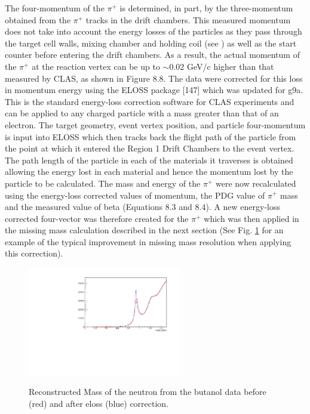 The four-momentum of the $\pi^+$ is determined, in part, by the three-momentum obtained from the $\pi^+$ tracks in the drift chambers. This measured momentum does not take into account the energy losses of the particles as they pass through the target cell walls, mixing chamber and holding coil (see \cite{Keith_2012}) as well as the start counter before entering the drift chambers. As a result, the actual momentum of the $\pi^+$ at the reaction vertex can be up to $\sim 0.02$ GeV/c higher than that measured by CLAS, as shown in Figure 8.8.
The data were corrected for this loss in momentum energy using the ELOSS package [147] which was updated for g9a. This is the standard energy-loss correction software for CLAS experiments and can be applied to any charged particle with a mass greater than that of an electron. The target geometry, event vertex position, and particle four-momentum is input into ELOSS which then tracks back the flight path of the particle from the point at which it entered the Region 1 Drift Chambers to the event vertex. The path length of the particle in each of the materials it traverses is obtained allowing the energy lost in each material and hence the momentum lost by the particle to be calculated. The mass and energy of the $\pi^+$ were now recalculated using the energy-loss corrected values of momentum, the PDG value of $\pi^+$ mass and the measured value of beta (Equations 8.3 and 8.4). A new energy-loss corrected four-vector was therefore created for the $\pi^+$ which was then applied in the missing mass calculation described in the next section (See Fig. \ref{fig:eloss_comp} for an example of the typical improvement in missing mass resolution when applying this correction).
\begin{figure}[htb]
  \begin{center}
    \includegraphics[width=0.6\textwidth]{figures/eloss_comp.pdf} \\
    \caption{Reconstructed Mass of the neutron from the butanol data before (red) and after eloss (blue) correction.}
    \label{fig:eloss_comp}
  \end{center}
\end{figure}



